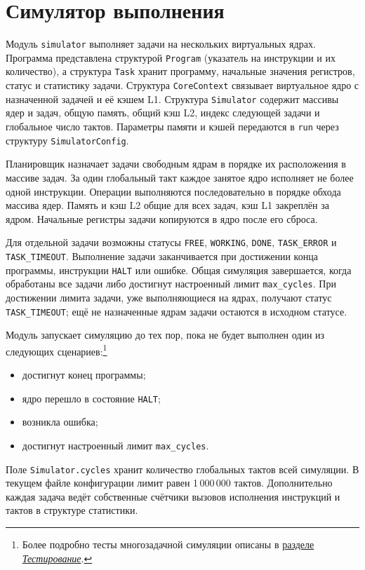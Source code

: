 \documentclass[12pt,a4paper]{article}
\begin{document}
\section{Симулятор выполнения}\label{sec:simulator}

Модуль \texttt{simulator} выполняет задачи на нескольких виртуальных ядрах. Программа представлена структурой \texttt{Program} (указатель на инструкции и их количество), а структура \texttt{Task} хранит программу, начальные значения регистров, статус и статистику задачи. Структура \texttt{CoreContext} связывает виртуальное ядро с назначенной задачей и её кэшем L1. Структура \texttt{Simulator} содержит массивы ядер и задач, общую память, общий кэш L2, индекс следующей задачи и глобальное число тактов. Параметры памяти и кэшей передаются в \texttt{run} через структуру \texttt{SimulatorConfig}.

Планировщик назначает задачи свободным ядрам в порядке их расположения в массиве задач. За один глобальный такт каждое занятое ядро исполняет не более одной инструкции. Операции выполняются последовательно в порядке обхода массива ядер. Память и кэш L2 общие для всех задач, кэш L1 закреплён за ядром. Начальные регистры задачи копируются в ядро после его сброса.

Для отдельной задачи возможны статусы \texttt{FREE}, \texttt{WORKING}, \texttt{DONE}, \texttt{TASK\_ERROR} и \texttt{TASK\_TIMEOUT}. Выполнение задачи заканчивается при достижении конца программы, инструкции \texttt{HALT} или ошибке. Общая симуляция завершается, когда обработаны все задачи либо достигнут настроенный лимит \texttt{max\_cycles}. При достижении лимита задачи, уже выполняющиеся на ядрах, получают статус \texttt{TASK\_TIMEOUT}; ещё не назначенные ядрам задачи остаются в исходном статусе.

Модуль запускает симуляцию до тех пор, пока не будет выполнен один из следующих сценариев:\footnote{Более подробно тесты многозадачной симуляции описаны в \hyperref[sec:testing]{разделе \textit{Тестирование}}.}

\begin{itemize}[leftmargin=1.5em]
    \item достигнут конец программы;
    \item ядро перешло в состояние \texttt{HALT};
    \item возникла ошибка;
    \item достигнут настроенный лимит \texttt{max\_cycles}.
\end{itemize}

Поле \texttt{Simulator.cycles} хранит количество глобальных тактов всей симуляции. В текущем файле конфигурации лимит равен 1\,000\,000 тактов. Дополнительно каждая задача ведёт собственные счётчики вызовов исполнения инструкций и тактов в структуре статистики.
\end{document}
